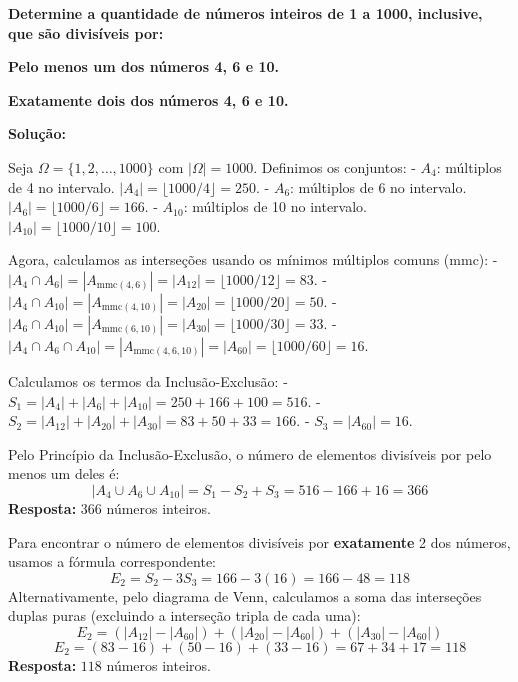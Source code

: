 \documentclass[a4paper,10pt,landscape,twocolumn]{article}  %
\let\oldenumerate\enumerate
\let\oldendenumerate\endenumerate
\renewenvironment{enumerate}{%
  \oldenumerate%
  \setlength{\itemsep}{1pt}%
  \setlength{\parskip}{0pt}%
  \setlength{\parsep}{0pt}%
  \setlength{\topsep}{2pt}%
  \setlength{\partopsep}{0pt}%
}{%
  \oldendenumerate%
}
\begin{document}
\begin{enumerate}
    \item \textbf{Determine a quantidade de números inteiros de 1 a 1000, inclusive, que são divisíveis por:}
    \begin{enumerate}
        \item \textbf{Pelo menos um dos números 4, 6 e 10.}
        \item \textbf{Exatamente dois dos números 4, 6 e 10.}
    \end{enumerate}
    
    \textbf{Solução:}
    
    Seja $\Omega = \{1, 2, \dots, 1000\}$ com $|\Omega| = 1000$. Definimos os conjuntos:
    - $A_4$: múltiplos de 4 no intervalo. $|A_4| = \lfloor 1000/4 \rfloor = 250$.
    - $A_6$: múltiplos de 6 no intervalo. $|A_6| = \lfloor 1000/6 \rfloor = 166$.
    - $A_{10}$: múltiplos de 10 no intervalo. $|A_{10}| = \lfloor 1000/10 \rfloor = 100$.
    
    Agora, calculamos as interseções usando os mínimos múltiplos comuns (mmc):
    - $|A_4 \cap A_6| = |A_{\text{mmc}(4,6)}| = |A_{12}| = \lfloor 1000/12 \rfloor = 83$.
    - $|A_4 \cap A_{10}| = |A_{\text{mmc}(4,10)}| = |A_{20}| = \lfloor 1000/20 \rfloor = 50$.
    - $|A_6 \cap A_{10}| = |A_{\text{mmc}(6,10)}| = |A_{30}| = \lfloor 1000/30 \rfloor = 33$.
    - $|A_4 \cap A_6 \cap A_{10}| = |A_{\text{mmc}(4,6,10)}| = |A_{60}| = \lfloor 1000/60 \rfloor = 16$.
    
    Calculamos os termos da Inclusão-Exclusão:
    - $S_1 = |A_4| + |A_6| + |A_{10}| = 250 + 166 + 100 = 516$.
    - $S_2 = |A_{12}| + |A_{20}| + |A_{30}| = 83 + 50 + 33 = 166$.
    - $S_3 = |A_{60}| = 16$.
    
    \begin{enumerate}
        \item Pelo Princípio da Inclusão-Exclusão, o número de elementos divisíveis por pelo menos um deles é:
        \[ |A_4 \cup A_6 \cup A_{10}| = S_1 - S_2 + S_3 = 516 - 166 + 16 = 366 \]
        \textbf{Resposta:} $366$ números inteiros.
        
        \item Para encontrar o número de elementos divisíveis por \textbf{exatamente} 2 dos números, usamos a fórmula correspondente:
        \[ E_2 = S_2 - 3S_3 = 166 - 3(16) = 166 - 48 = 118 \]
        Alternativamente, pelo diagrama de Venn, calculamos a soma das interseções duplas puras (excluindo a interseção tripla de cada uma):
        \[ E_2 = (|A_{12}| - |A_{60}|) + (|A_{20}| - |A_{60}|) + (|A_{30}| - |A_{60}|) \]
        \[ E_2 = (83 - 16) + (50 - 16) + (33 - 16) = 67 + 34 + 17 = 118 \]
        \textbf{Resposta:} $118$ números inteiros.
    \end{enumerate}
\end{enumerate}
\end{document}
